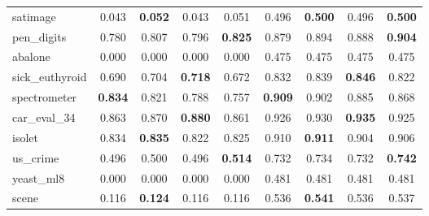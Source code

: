 \begin{figure}[ht]
\begin{tabular}{p{22mm}|*4{p{14mm}}|*4{p{14mm}}}
        satimage&\multicolumn{1}{c}{0.043}&\multicolumn{1}{c}{\textbf{0.052}}&\multicolumn{1}{c}{0.043}&\multicolumn{1}{c|}{0.051}&\multicolumn{1}{c}{0.496}&\multicolumn{1}{c}{\textbf{0.500}}&\multicolumn{1}{c}{0.496}&\multicolumn{1}{c}{\textbf{0.500}}\\
        pen\_digits&\multicolumn{1}{c}{0.780}&\multicolumn{1}{c}{0.807}&\multicolumn{1}{c}{0.796}&\multicolumn{1}{c|}{\textbf{0.825}}&\multicolumn{1}{c}{0.879}&\multicolumn{1}{c}{0.894}&\multicolumn{1}{c}{0.888}&\multicolumn{1}{c}{\textbf{0.904}}\\
        abalone&\multicolumn{1}{c}{0.000}&\multicolumn{1}{c}{0.000}&\multicolumn{1}{c}{0.000}&\multicolumn{1}{c|}{0.000}&\multicolumn{1}{c}{0.475}&\multicolumn{1}{c}{0.475}&\multicolumn{1}{c}{0.475}&\multicolumn{1}{c}{0.475}\\
        sick\_euthyroid&\multicolumn{1}{c}{0.690}&\multicolumn{1}{c}{0.704}&\multicolumn{1}{c}{\textbf{0.718}}&\multicolumn{1}{c|}{0.672}&\multicolumn{1}{c}{0.832}&\multicolumn{1}{c}{0.839}&\multicolumn{1}{c}{\textbf{0.846}}&\multicolumn{1}{c}{0.822}\\
        spectrometer&\multicolumn{1}{c}{\textbf{0.834}}&\multicolumn{1}{c}{0.821}&\multicolumn{1}{c}{0.788}&\multicolumn{1}{c|}{0.757}&\multicolumn{1}{c}{\textbf{0.909}}&\multicolumn{1}{c}{0.902}&\multicolumn{1}{c}{0.885}&\multicolumn{1}{c}{0.868}\\
        car\_eval\_34&\multicolumn{1}{c}{0.863}&\multicolumn{1}{c}{0.870}&\multicolumn{1}{c}{\textbf{0.880}}&\multicolumn{1}{c|}{0.861}&\multicolumn{1}{c}{0.926}&\multicolumn{1}{c}{0.930}&\multicolumn{1}{c}{\textbf{0.935}}&\multicolumn{1}{c}{0.925}\\
        isolet&\multicolumn{1}{c}{0.834}&\multicolumn{1}{c}{\textbf{0.835}}&\multicolumn{1}{c}{0.822}&\multicolumn{1}{c|}{0.825}&\multicolumn{1}{c}{0.910}&\multicolumn{1}{c}{\textbf{0.911}}&\multicolumn{1}{c}{0.904}&\multicolumn{1}{c}{0.906}\\
        us\_crime&\multicolumn{1}{c}{0.496}&\multicolumn{1}{c}{0.500}&\multicolumn{1}{c}{0.496}&\multicolumn{1}{c|}{\textbf{0.514}}&\multicolumn{1}{c}{0.732}&\multicolumn{1}{c}{0.734}&\multicolumn{1}{c}{0.732}&\multicolumn{1}{c}{\textbf{0.742}}\\
        yeast\_ml8&\multicolumn{1}{c}{0.000}&\multicolumn{1}{c}{0.000}&\multicolumn{1}{c}{0.000}&\multicolumn{1}{c|}{0.000}&\multicolumn{1}{c}{0.481}&\multicolumn{1}{c}{0.481}&\multicolumn{1}{c}{0.481}&\multicolumn{1}{c}{0.481}\\
        scene&\multicolumn{1}{c}{0.116}&\multicolumn{1}{c}{\textbf{0.124}}&\multicolumn{1}{c}{0.116}&\multicolumn{1}{c|}{0.116}&\multicolumn{1}{c}{0.536}&\multicolumn{1}{c}{\textbf{0.541}}&\multicolumn{1}{c}{0.536}&\multicolumn{1}{c}{0.537}\\

\end{tabular}
\end{figure}
